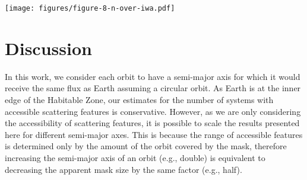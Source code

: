 \documentclass[usenatbib]{mnras}
\newcommand{\IWA}{\ensuremath{\mathrm{IWA}}\xspace}
\newcommand{\Decadal}{Astro2020}  %
\begin{document}
\begin{figure*}
    \centering
    \texttt{[image: figures/figure-8-n-over-iwa.pdf]}
    \caption{
        The number of systems for which key optical phenomena (Rayleigh scattering peak, rainbow, ocean glint, glory) would be accessible as functions of the \IWA.
        Each subplot contains three lines showing the number of systems where the start of each the phenomenon is accessible (dashed lines), where the peak is accessible (solid lines), and where the end is accessible (dotted lines).
        For Rayleigh scattering, the line for the start of the feature (at $\alpha=\qty{70}{\degree}$) and the line for the peak (at $\alpha=\qty{110}{\degree}$) coincide, as their respective phase angles are at the same distance from quadrature.
        The $x$-axis at the bottom shows the \IWA of the coronagraph in \unit{mas}, and the $x$-axis at the top shows the same \IWA converted to $\lambda/D$ for $\lambda = \qty{600}{\nano\meter}$ and $D = \qty{6}{\meter}$.
        The $y$-axis on the right indicates the number of systems where all phenomena would be accessible, assuming \qty{24}{\percent} of them have an Earth-like exoplanet in their HZ (as assumed in \Decadal).
    }
    \label{fig:accessible_phase_angles}
\end{figure*}


\vspace{-2mm}
\section{Discussion}
\label{sec:4}

In this work, we consider each orbit to have a semi-major axis for which it would receive the same flux as Earth assuming a circular orbit.
%
As Earth is at the inner edge of the Habitable Zone, our estimates for the number of systems with accessible scattering features is conservative.
%
However, as we are only considering the accessibility of scattering features, it is possible to scale the results presented here for different semi-major axes. 
%
This is because the range of accessible features is determined only by the amount of the orbit covered by the mask, therefore increasing the semi-major axis of an orbit (e.g., double) is equivalent to decreasing the apparent mask size by the same factor (e.g., half).
\end{document}
